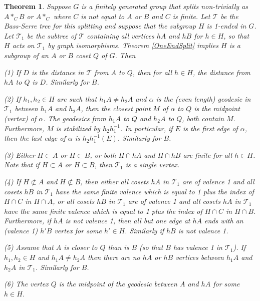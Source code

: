 \documentclass[12pt]{article}
\newtheorem{theorem}{Theorem}[subsection]
\begin{document}
\begin{theorem}
Suppose $G$ is a finitely generated group that splits non-trivially as  $A\ast_C B$ or $A\ast_C$ where $C$ is not equal to $A$ or $B$ and $C$ is finite. Let $\mathcal T$ be the Bass-Serre tree for this splitting and suppose that the subgroup  $H$ is 1-ended in  $G$. Let $\mathcal T_1$ be the subtree of $\mathcal T$ containing all vertices $hA$ and $hB$ for $h\in H$, so that $H$ acts on $\mathcal T_1$ by graph isomorphisms. Theorem \ref{OneEndSplit} implies $H$ is a subgroup of an $A$ or $B$ coset $Q$ of $G$. Then

(1) If $D$ is the distance in $\mathcal T$ from $A$ to $Q$, then for all $h\in H$, the distance from $hA$ to $Q$ is $D$. Similarly for $B$. 

(2) If $h_1, h_2\in H$ are such that $h_1A\ne h_2A$ and $\alpha$ is the (even length) geodesic in $\mathcal T_1$ between $h_1A$ and $h_2A$, then the closest point $M$ of $\alpha$ to $Q$  is the midpoint (vertex) of $\alpha$. The geodesics from $h_1A$ to $Q$ and $h_2A$ to $Q$, both contain $M$. Furthermore, $M$ is stabilized by $h_2h_1^{-1}$. In particular, if $E$ is the first edge of $\alpha$, then the last edge of $\alpha$ is $h_2h_1^{-1}(E)$. Similarly for $B$.

(3) Either $H\subset A$ or $H\subset B$, or both $H\cap hA$ and $H\cap hB$ are finite for all $h\in H$. Note that if $H\subset A$ or $H\subset B$, then $\mathcal T_1$ is a single vertex. 

(4) If $H\not\subset A$ and $H\not\subset B$, then either all cosets $hA$ in $\mathcal T_1$ are of valence 1 and all cosets $hB$ in $\mathcal T_1$ have the same finite valence which is equal to 1 plus the index of $H\cap C$ in $H\cap A$, or all cosets $hB$ in $\mathcal T_1$ are of valence 1 and all cosets $hA$ in $\mathcal T_1$ have the same finite valence which is equal to 1 plus the index of $H\cap C$ in $H\cap B$. Furthermore, if $hA$ is not valence 1, then all but one edge at $hA$ ends with an (valence 1) $h'B$ vertex for some $h'\in H$. Similarly if $hB$ is not valence 1. 

(5) Assume that $A$ is closer to $Q$ than is $B$ (so that $B$ has valence 1 in $\mathcal T_1$). If $h_1,h_2\in H$ and $h_1A\ne h_2A$ then there are no $hA$ or $hB$ vertices between $h_1A$ and $h_2A$ in $\mathcal T_1$. Similarly for $B$. 

(6) The vertex $Q$ is the midpoint of the geodesic between $A$ and $hA$ for some $h\in H$. 
\end{theorem}
\end{document}
